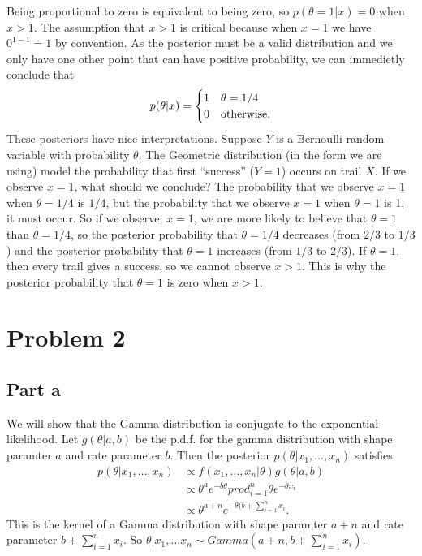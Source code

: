 \documentclass[a4paper,10pt]{article}
\begin{document}
Being proportional to zero is equivalent to being zero, so $p(\theta=1|x) = 0$ when $x>1$.  The assumption that $x>1$ is critical because when $x=1$ we have $0^{1-1}=1$ by convention.  As the posterior must be a valid distribution and we only have one other point that can have positive probability, we can immedietly conclude that 
\begin{align*}
 p(\theta|x) = \begin{cases}
                1 & \theta = 1/4 \\
                0 & $otherwise.$ \\
               \end{cases}
\end{align*}
These posteriors have nice interpretations.  Suppose $Y$ is a Bernoulli random variable with probability $\theta$.  The Geometric distribution (in the form we are using) model the probability that first ``success'' ($Y=1$) occurs on trail $X$.  If we observe $x=1$, what should we conclude?  The probability that we observe $x=1$ when $\theta = 1/4$ is $1/4$, but the probability that we observe $x=1$ when $\theta = 1$ is 1, it must occur.  So if we observe, $x=1$, we are more likely to believe that $\theta=1$ than $\theta=1/4$, so the posterior probability that $\theta = 1/4$ decreases (from $2/3$ to $1/3$) and the posterior probability that $\theta = 1$ increases (from $1/3$ to $2/3$).  If $\theta = 1$, then every trail gives a success, so we cannot observe $x>1$.  This is why the posterior probability that $\theta = 1$ is zero when $x>1$.  

\section{Problem 2}
\subsection{Part a}
We will show that the Gamma distribution is conjugate to the exponential likelihood.  Let $g(\theta|a,b)$ be the p.d.f. for the gamma distribution with shape paramter $a$ and rate parameter $b$.  Then the posterior $p(\theta|x_1, \ldots, x_n)$ satisfies
\begin{align*}
 p(\theta|x_1, \ldots, x_n) &\propto f(x_1, \ldots, x_n|\theta)g(\theta|a,b) \\
 &\propto \theta^a e^{-b \theta} prod_{i=1}^n {\theta e^{-\theta x_i}}  \\
 &\propto \theta^{a+n} e^{-\theta(b + \sum_{i=1}^n x_i}. 
\end{align*}
This is the kernel of a Gamma distribution with shape paramter $a+n$ and rate parameter $b + \sum_{i=1}^n x_i$.  So $\theta|x_1, \ldots x_n \sim Gamma(a+n, b+ \sum_{i=1}^n x_i)$.  
\end{document}
